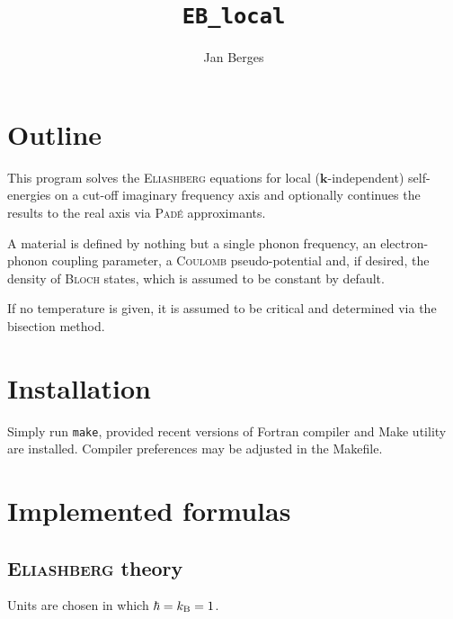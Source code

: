 \documentclass[twocolumn]{article}
\title{\tt EB\_local}
\author{Jan Berges}
\def\sub#1{\sb{\mathrm{#1}}}
\let\vec\boldsymbol
\let\name\textsc
\begin{document}
   \maketitle

   \section{Outline}

   This  program  solves  the   \name{Eliashberg}  equations  for  local  ($\vec
   k$-independent)  self-energies  on a  cut-off  imaginary  frequency axis  and
   optionally  continues   the  results  to   the  real  axis   via  \name{Padé}
   approximants.

   A  material  is  defined  by  nothing  but  a  single  phonon  frequency,  an
   electron-phonon coupling parameter, a \name{Coulomb} pseudo-potential and, if
   desired, the density of \name{Bloch} states,  which is assumed to be constant
   by default.

   If no temperature is  given, it is assumed to be  critical and determined via
   the bisection method.

   \section{Installation}

   Simply run \verb|make|, provided recent versions of Fortran compiler and Make
   utility are installed. Compiler preferences may be adjusted in the Makefile.

   \section{Implemented formulas}

   \subsection{\textsc{Eliashberg} theory}

   Units are chosen in which $\hbar = k \sub B = 1$.
\end{document}
